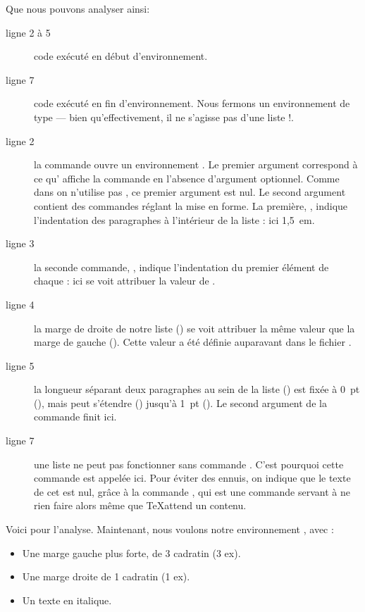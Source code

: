 Que nous pouvons analyser ainsi:
\begin{description}
\item[ligne 2 à 5] code exécuté en début d'environnement.
\item[ligne 7] code exécuté en fin d'environnement. Nous fermons un environnement de type  --- bien qu'effectivement, il ne s'agisse pas d'une liste !.
\item[ligne 2] la commande  ouvre un environnement . Le premier argument correspond à ce qu' affiche  la commande  en l'absence d'argument optionnel. Comme dans  on n'utilise pas , ce premier argument est nul. Le second argument contient des commandes réglant la mise en forme. La première, , indique l'indentation des paragraphes à l'intérieur de la liste : ici 1,5~em.
\item[ligne 3] la seconde commande, , indique l'indentation du premier élément de chaque : ici  se voit attribuer la valeur de .
\item[ligne 4] la marge de droite de notre liste () se voit attribuer la même valeur que la marge de gauche (). Cette valeur a été définie auparavant dans le fichier .
\item[ligne 5]la longueur séparant deux paragraphes au sein de la liste () est fixée à 0~pt (), mais peut s'étendre () jusqu'à 1~pt (). Le second argument de la commande  finit ici.
\item[ligne 7]une liste ne peut pas fonctionner sans commande . C'est pourquoi cette commande est appelée ici. Pour éviter des ennuis, on indique que le texte de cet  est nul, grâce à la commande , qui est une commande servant à ne rien faire alors même que \TeX attend un contenu.
\end{description}

Voici pour l'analyse. Maintenant, nous voulons notre environnement , avec :
\begin{itemize}
\item Une marge gauche plus forte, de 3 cadratin (3 ex).
\item Une marge droite de 1 cadratin (1 ex). 
\item Un texte en italique.
\end{itemize}

